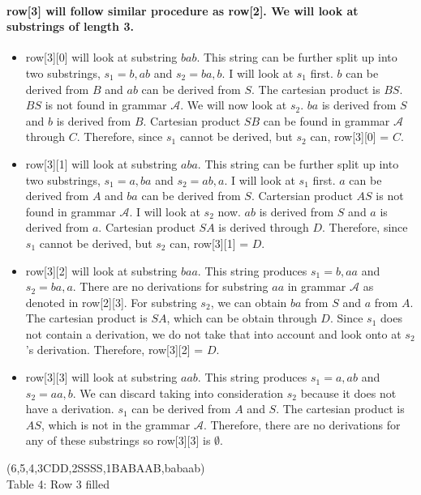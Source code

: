 \documentclass[12pt]{article}
\begin{document}
\paragraph{row[3] will follow similar procedure as row[2]. We will look at substrings of length 3.}
\begin{itemize}
    \item row[3][0] will look at substring $bab$. This string can be further split up into two substrings, $s_1 = b, ab$ and $s_2 = ba, b$. I will look at $s_1$ first. $b$ can be derived from $B$ and $ab$ can be derived from $S$. The cartesian product is $BS$. $BS$ is not found in grammar $\mathcal{A}$. We will now look at $s_2$. $ba$ is derived from $S$ and $b$ is derived from $B$. Cartesian product $SB$ can be found in grammar $\mathcal{A}$ through $C$. Therefore, since $s_1$ cannot be derived, but $s_2$ can, row[3][0] = $C$.
    \item row[3][1] will look at substring $aba$. This string can be further split up into two substrings, $s_1 = a, ba$ and $s_2 = ab, a$. I will look at $s_1$ first. $a$ can be derived from $A$ and $ba$ can be derived from $S$. Cartersian product $AS$ is not found in grammar $\mathcal{A}$. I will look at $s_2$ now. $ab$ is derived from $S$ and $a$ is derived from $a$. Cartesian product $SA$ is derived through $D$. Therefore, since $s_1$ cannot be derived, but $s_2$ can, row[3][1] = $D$.
    \item row[3][2] will look at substring $baa$. This string produces $s_1 =  b, aa$ and $s_2 = ba, a$. There are no derivations for substring $aa$ in grammar $\mathcal{A}$ as denoted in row[2][3]. For substring $s_2$, we can obtain $ba$ from $S$ and $a$ from $A$. The cartesian product is $SA$, which can be obtain through $D$. Since $s_1$ does not contain a derivation, we do not take that into account and look onto at $s_2$'s derivation. Therefore, row[3][2] = $D$.   
    \item row[3][3] will look at substring $aab$. This string produces $s_1 = a, ab$ and $s_2 = aa, b$. We can discard taking into consideration $s_2$ because it does not have a derivation. $s_1$ can be derived from $A$ and $S$. The cartesian product is $AS$, which is not in the grammar $\mathcal{A}$. Therefore, there are no derivations for any of these substrings so row[3][3] is $\emptyset$.
\end{itemize}

\begin{center}
    \young(6\hfill,5\hfill \hfill,4\hfill \hfill \hfill,3CDD\emptyset,2SSS\emptyset S,1BABAAB,\hfill babaab) \\
    Table 4: Row 3 filled
\end{center}
\clearpage
\end{document}
